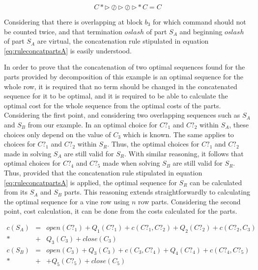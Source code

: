 \begin{equation}
	C* \triangleright \oslash \triangleright \oslash \triangleright *C = C \label{eq:ruleconcatpartsA}
\end{equation}

Considering that there is overlapping at block $b_{3}$ for which command should not be counted twice, and that termination $oslash$ of part $S_A$ and beginning $oslash$ of part $S_A$ are virtual, the concatenation rule stipulated in equation \ref{eq:ruleconcatpartsA} is easily understood.

In order to prove that the concatenation of two optimal sequences found for the parts provided by decomposition of this example is an optimal sequence for the whole row, it is required that no term should be changed in the concatenated sequence for it to be optimal, and it is required to be able to calculate the optimal cost for the whole sequence from the optimal costs of the parts.
Considering the first point, and considering two overlapping sequences such as $S_A$ and $S_B$ from our example. In an optimal choice for $C?_{1}$ and $C?_{2}$ within $S_A$, these choices only depend on the value of $C_{3}$ which is known. The same applies to choices for $C?_{1}$ and $C?_{2}$ within $S_R$. Thus, the optimal choices for $C?_{1}$ and $C?_{2}$ made in solving $S_A$ are still valid for $S_R$. With similar reasoning, it follows that optimal choices for $C?_{4}$ and $C?_{5}$ made when solving $S_B$ are still valid for $S_R$. Thus, provided that the concatenation rule stipulated in equation \ref{eq:ruleconcatpartsA} is applied, the optimal sequence for $S_R$ can be calculated from its $S_A$ and $S_B$ parts. This reasoning extends straightforwardly to calculating the optimal sequence for a vine row using $n$ row parts.
Considering the second point, cost calculation, it can be done from the costs calculated for the parts.

\begin{eqnarray}
	c(S_A) & = & open(C?_{1})+Q_{1}(C?_{1})+c(C?_{1},C?_{2})+Q_{2}(C?_{2})+c(C?_{2},C_3) \nonumber \\*
	& + & Q_{3}(C_{3})+close(C_{3}) \label{eq:costsa_anxA} \\
	c(S_B) & = & open(C_{3})+Q_{3}(C_{3})+c(C_{3},C?_{4})+Q_{4}(C?_{4})+c(C?_{4},C?_{5}) \nonumber \\*
	& + & +Q_{5}(C?_{5})+close(C_{5}) \label{eq:costsb_anxA}
\end{eqnarray}

